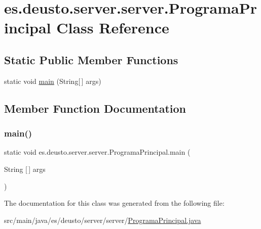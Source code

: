 \hypertarget{classes_1_1deusto_1_1server_1_1server_1_1_programa_principal}{}\section{es.\+deusto.\+server.\+server.\+Programa\+Principal Class Reference}
\label{classes_1_1deusto_1_1server_1_1server_1_1_programa_principal}
\subsection*{Static Public Member Functions}
\begin{DoxyCompactItemize}
\item 
static void \mbox{\hyperlink{classes_1_1deusto_1_1server_1_1server_1_1_programa_principal_afa9f532d582524913b6bb5072139eeb2}{main}} (String\mbox{[}$\,$\mbox{]} args)
\end{DoxyCompactItemize}


\subsection{Member Function Documentation}
\mbox{\label{classes_1_1deusto_1_1server_1_1server_1_1_programa_principal_afa9f532d582524913b6bb5072139eeb2}} 
\subsubsection{\texorpdfstring{main()}{main()}}
{\footnotesize\ttfamily static void es.\+deusto.\+server.\+server.\+Programa\+Principal.\+main (\begin{DoxyParamCaption}\item[{String \mbox{[}$\,$\mbox{]}}]{args }\end{DoxyParamCaption})\hspace{0.3cm}{\ttfamily [static]}}



The documentation for this class was generated from the following file\+:\begin{DoxyCompactItemize}
\item 
src/main/java/es/deusto/server/server/\mbox{\hyperlink{_programa_principal_8java}{Programa\+Principal.\+java}}\end{DoxyCompactItemize}
